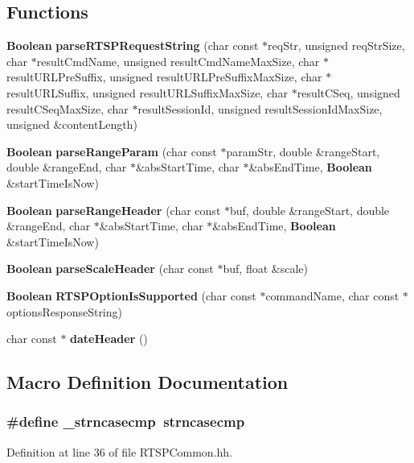 \subsection*{Functions}
\begin{DoxyCompactItemize}
\item 
{\bf Boolean} {\bf parse\+R\+T\+S\+P\+Request\+String} (char const $\ast$req\+Str, unsigned req\+Str\+Size, char $\ast$result\+Cmd\+Name, unsigned result\+Cmd\+Name\+Max\+Size, char $\ast$result\+U\+R\+L\+Pre\+Suffix, unsigned result\+U\+R\+L\+Pre\+Suffix\+Max\+Size, char $\ast$result\+U\+R\+L\+Suffix, unsigned result\+U\+R\+L\+Suffix\+Max\+Size, char $\ast$result\+C\+Seq, unsigned result\+C\+Seq\+Max\+Size, char $\ast$result\+Session\+Id, unsigned result\+Session\+Id\+Max\+Size, unsigned \&content\+Length)
\item 
{\bf Boolean} {\bf parse\+Range\+Param} (char const $\ast$param\+Str, double \&range\+Start, double \&range\+End, char $\ast$\&abs\+Start\+Time, char $\ast$\&abs\+End\+Time, {\bf Boolean} \&start\+Time\+Is\+Now)
\item 
{\bf Boolean} {\bf parse\+Range\+Header} (char const $\ast$buf, double \&range\+Start, double \&range\+End, char $\ast$\&abs\+Start\+Time, char $\ast$\&abs\+End\+Time, {\bf Boolean} \&start\+Time\+Is\+Now)
\item 
{\bf Boolean} {\bf parse\+Scale\+Header} (char const $\ast$buf, float \&scale)
\item 
{\bf Boolean} {\bf R\+T\+S\+P\+Option\+Is\+Supported} (char const $\ast$command\+Name, char const $\ast$options\+Response\+String)
\item 
char const $\ast$ {\bf date\+Header} ()
\end{DoxyCompactItemize}


\subsection{Macro Definition Documentation}
\subsubsection[{\+\_\+strncasecmp}]{\setlength{\rightskip}{0pt plus 5cm}\#define \+\_\+strncasecmp~strncasecmp}\label{RTSPCommon_8hh_a04aa9246de29862064d2a5bfb13e455c}


Definition at line 36 of file R\+T\+S\+P\+Common.\+hh.

